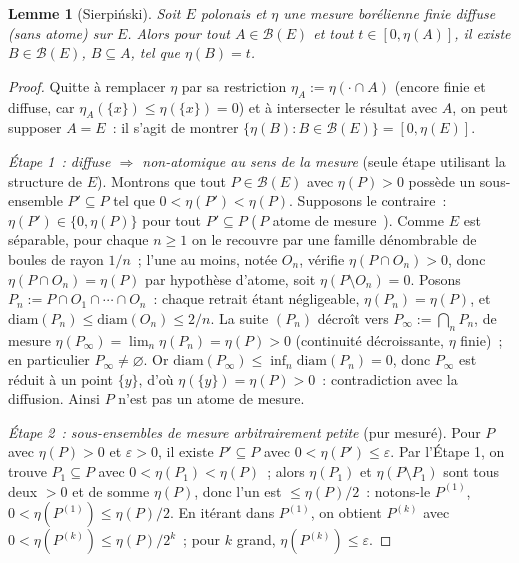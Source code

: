 \documentclass[11pt,a4paper]{article}
\providecommand{\og}{\guillemotleft\,}\providecommand{\fg}{\,\guillemotright}
\theoremstyle{plain}
\newtheorem{lemme}[theoreme]{Lemme}
\theoremstyle{definition}
\newcommand{\eps}{\varepsilon}
\newcommand{\calB}{\mathcal{B}}
\begin{document}
\begin{lemme}[Sierpiński]\label{lem:sierpinski}
Soit $E$ polonais et $\eta$ une mesure borélienne finie \emph{diffuse} (sans atome) sur $E$. Alors pour tout $A\in\calB(E)$ et tout $t\in[0,\eta(A)]$, il existe $B\in\calB(E)$, $B\subseteq A$, tel que $\eta(B)=t$.
\end{lemme}

\begin{proof}
Quitte à remplacer $\eta$ par sa restriction $\eta_A:=\eta(\cdot\cap A)$ (encore finie et diffuse, car $\eta_A(\{x\})\le\eta(\{x\})=0$) et à intersecter le résultat avec $A$, on peut supposer $A=E$~: il s'agit de montrer $\{\eta(B):B\in\calB(E)\}=[0,\eta(E)]$.

\emph{Étape 1~: diffuse $\Rightarrow$ non-atomique au sens de la mesure} (seule étape utilisant la structure de $E$). Montrons que tout $P\in\calB(E)$ avec $\eta(P)>0$ possède un sous-ensemble $P'\subseteq P$ tel que $0<\eta(P')<\eta(P)$. Supposons le contraire~: $\eta(P')\in\{0,\eta(P)\}$ pour tout $P'\subseteq P$ (\og $P$ atome de mesure \fg{}). Comme $E$ est séparable, pour chaque $n\ge1$ on le recouvre par une famille dénombrable de boules de rayon $1/n$~; l'une au moins, notée $O_n$, vérifie $\eta(P\cap O_n)>0$, donc $\eta(P\cap O_n)=\eta(P)$ par hypothèse d'atome, soit $\eta(P\setminus O_n)=0$. Posons $P_n:=P\cap O_1\cap\cdots\cap O_n$~: chaque retrait étant négligeable, $\eta(P_n)=\eta(P)$, et $\mathrm{diam}(P_n)\le\mathrm{diam}(O_n)\le 2/n$. La suite $(P_n)$ décroît vers $P_\infty:=\bigcap_n P_n$, de mesure $\eta(P_\infty)=\lim_n\eta(P_n)=\eta(P)>0$ (continuité décroissante, $\eta$ finie)~; en particulier $P_\infty\neq\varnothing$. Or $\mathrm{diam}(P_\infty)\le\inf_n\mathrm{diam}(P_n)=0$, donc $P_\infty$ est réduit à un point $\{y\}$, d'où $\eta(\{y\})=\eta(P)>0$~: contradiction avec la diffusion. Ainsi $P$ n'est pas un atome de mesure.

\emph{Étape 2~: sous-ensembles de mesure arbitrairement petite} (pur mesuré). Pour $P$ avec $\eta(P)>0$ et $\eps>0$, il existe $P'\subseteq P$ avec $0<\eta(P')\le\eps$. Par l'Étape 1, on trouve $P_1\subseteq P$ avec $0<\eta(P_1)<\eta(P)$~; alors $\eta(P_1)$ et $\eta(P\setminus P_1)$ sont tous deux $>0$ et de somme $\eta(P)$, donc l'un est $\le\eta(P)/2$~: notons-le $P^{(1)}$, $0<\eta(P^{(1)})\le\eta(P)/2$. En itérant dans $P^{(1)}$, on obtient $P^{(k)}$ avec $0<\eta(P^{(k)})\le\eta(P)/2^k$~; pour $k$ grand, $\eta(P^{(k)})\le\eps$.


\end{proof}
\end{document}
